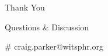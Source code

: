 \documentclass[aspectratio=169]{beamer}
\begin{document}
\begin{frame}[plain]
    \vspace{1cm}
    \begin{center}
        \textcolor{witsteal}{\Huge Thank You}
        \vspace{0.8cm}
        
        \textcolor{witsdark}{\Large Questions \& Discussion}
        \vspace{1cm}
        
        \textcolor{witsaccent}{\# craig.parker@witsphr.org}
    \end{center}
\end{frame}
\end{document}
